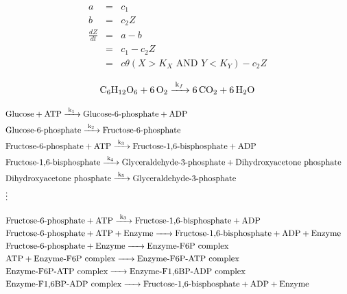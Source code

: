 \documentclass{article}
\begin{document}
\large

\begin{eqnarray*}
a & = & c_1\\
b & = & c_2 Z\\
 \frac{dZ}{dt} & = & a - b\\
 & = & c_1 - c_2 Z\\
 & = & c \theta \left( X > K_X \textrm{ AND } Y < K_Y \right) - c_2Z
 \end{eqnarray*}

\begin{eqnarray*}
\ce{\textrm{C$_6$H$_{12}$O$_6$} + 6 \textrm{O}_2 ->[k_f] 6\textrm{CO}_2 + 6 \textrm{H$_2$O}}
\end{eqnarray*}

\begin{eqnarray*}
& \ce{\textrm{Glucose} + \textrm{ATP} ->[k_1]  \textrm{Glucose-6-phosphate} + \textrm{ADP}} &\\
& \ce{\textrm{Glucose-6-phosphate}  ->[k_2]  \textrm{Fructose-6-phosphate} } &\\
&\ce{\textrm{Fructose-6-phosphate} + \textrm{ATP} ->[k_3]  \textrm{Fructose-1,6-bisphosphate} + \textrm{ADP} }&\\
&\ce{\textrm{Fructose-1,6-bisphosphate} ->[k_4] \textrm{Glyceraldehyde-3-phosphate} + \textrm{Dihydroxyacetone phosphate}}&\\
&\ce{\textrm{Dihydroxyacetone phosphate} ->[k_5] \textrm{Glyceraldehyde-3-phosphate}}&\\
& \vdots &
\end{eqnarray*}

\begin{eqnarray*}
&\ce{\textrm{Fructose-6-phosphate} + \textrm{ATP} ->[k_3]  \textrm{Fructose-1,6-bisphosphate} + \textrm{ADP} }&\\
&\ce{\textrm{Fructose-6-phosphate} + \textrm{ATP} + \textrm{Enzyme} -> \textrm{Fructose-1,6-bisphosphate} + \textrm{ADP} + \textrm{Enzyme}}&\\
&\ce{\textrm{Fructose-6-phosphate} + \textrm{Enzyme} -> \textrm{Enzyme-F6P complex}}&\\
&\ce{\textrm{ATP} + \textrm{Enzyme-F6P complex} -> \textrm{Enzyme-F6P-ATP complex}}&\\
&\ce{\textrm{Enzyme-F6P-ATP complex} -> \textrm{Enzyme-F1,6BP-ADP complex}}&\\
&\ce{\textrm{Enzyme-F1,6BP-ADP complex} -> \textrm{Fructose-1,6-bisphosphate} + \textrm{ADP} + \textrm{Enzyme}}&
\end{eqnarray*}
\end{document}
